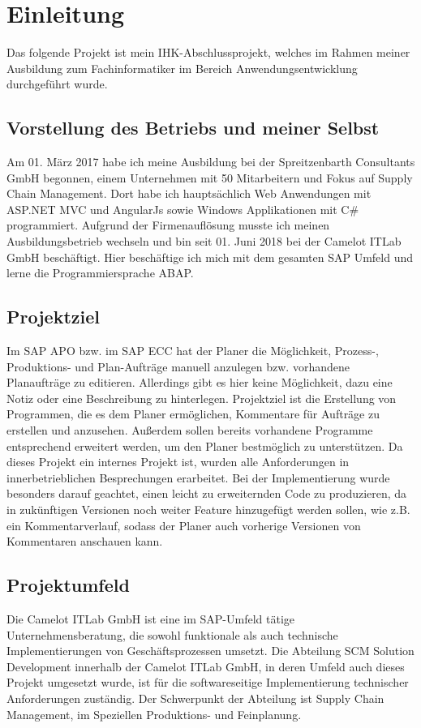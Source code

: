 \section{Einleitung}
\label{sec:Einleitung}
Das folgende Projekt ist mein IHK-Abschlussprojekt, welches im Rahmen meiner Ausbildung zum Fachinformatiker im Bereich Anwendungsentwicklung durchgeführt wurde.

\subsection{Vorstellung des Betriebs und meiner Selbst} 
\label{sec:Vorstellung des Betriebs und meiner Selbst}
Am 01. März 2017 habe ich meine Ausbildung bei der Spreitzenbarth Consultants GmbH begonnen, einem Unternehmen mit 50 Mitarbeitern und Fokus auf Supply Chain Management. Dort habe ich hauptsächlich Web Anwendungen mit ASP.NET MVC und AngularJs sowie Windows Applikationen mit C\# programmiert. Aufgrund der Firmenauflösung musste ich meinen Ausbildungsbetrieb wechseln und bin seit 01. Juni 2018 bei der Camelot ITLab GmbH beschäftigt. Hier beschäftige ich mich mit dem gesamten SAP Umfeld und lerne die Programmiersprache \ac{ABAP}.

\subsection{Projektziel} 
\label{sec:Projektziel}
Im SAP \ac{APO} bzw. im SAP \ac{ECC} hat der Planer die Möglichkeit, Prozess-, Produktions- und Plan-Aufträge manuell anzulegen bzw. vorhandene Planaufträge zu editieren. Allerdings gibt es hier keine Möglichkeit, dazu eine Notiz oder eine Beschreibung zu hinterlegen. Projektziel ist die Erstellung von Programmen, die es dem Planer ermöglichen, Kommentare	für Aufträge zu erstellen und anzusehen. Außerdem sollen bereits vorhandene Programme entsprechend erweitert werden, um den Planer bestmöglich zu unterstützen. Da dieses Projekt ein internes Projekt ist, wurden alle Anforderungen in innerbetrieblichen Besprechungen erarbeitet. Bei der Implementierung wurde besonders darauf geachtet, einen leicht zu erweiternden Code zu produzieren, da in zukünftigen Versionen noch weiter Feature hinzugefügt werden sollen, wie z.B. ein Kommentarverlauf, sodass der Planer auch vorherige Versionen von Kommentaren anschauen kann. 

\subsection{Projektumfeld}
\label{sec:Projektumfeld}
Die Camelot ITLab GmbH ist eine im SAP-Umfeld tätige Unternehmensberatung, die sowohl funktionale als auch technische Implementierungen von Geschäftsprozessen umsetzt.	Die Abteilung SCM Solution Development innerhalb der Camelot ITLab GmbH, in deren Umfeld	auch dieses Projekt umgesetzt wurde, ist für die softwareseitige Implementierung technischer	Anforderungen zuständig. Der Schwerpunkt der Abteilung ist Supply Chain Management, im Speziellen Produktions- und Feinplanung.


